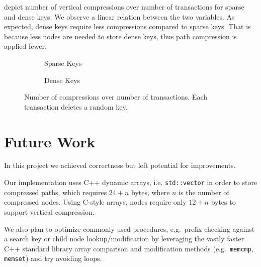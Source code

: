 \documentclass[abstracton,12pt]{scrartcl}
\theoremstyle{definition}
\begin{document}
 depict number of vertical
compressions over number of transactions for sparse and dense keys. 
We observe a linear relation between the two variables. As expected, 
dense keys require less compressions compared to sparse keys. That is because 
less nodes are needed to store dense keys, thus path compression is applied
fewer.

\begin{figure}[H]
  \centering
  \begin{subfigure}[b]{0.49\textwidth}
    \caption{Sparse Keys}
    \label{fig:compressions-sparse}
  \end{subfigure}
  \begin{subfigure}[b]{0.49\textwidth}
    \caption{Dense Keys}
    \label{fig:compressions-dense}
  \end{subfigure}
  \caption{Number of compressions over number of transactions. Each transaction
  deletes a random key.}
\end{figure}

\section{Future Work}
\label{sec:future-work}

In this project we achieved correctness but left potential for improvements.

Our implementation uses C++ dynamic arrays, i.e. \texttt{std::vector} in order
to store compressed paths, which requires $24 + n$ bytes, where $n$ is the
number of compressed nodes. Using C-style arrays, nodes require only $12 + n$
bytes to support vertical compression.

We also plan to optimize commonly used procedures, e.g.\ prefix checking
against a search key or child node lookup/modification by leveraging the vastly
faster C++ standard library array comparison and modification methods
(e.g.\ \texttt{memcmp}, \texttt{memset}) and try avoiding loops.
\end{document}
